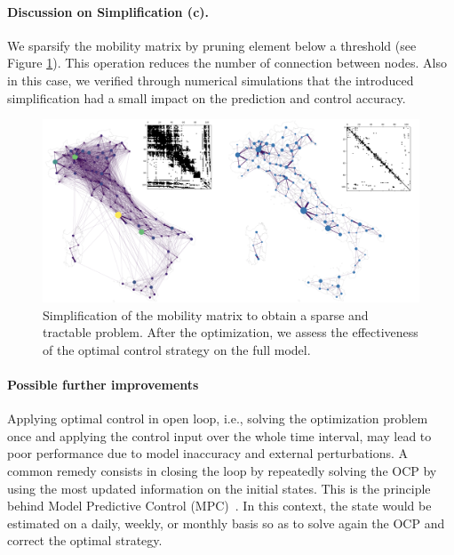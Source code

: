 \paragraph{Discussion on Simplification (c).} We sparsify the mobility matrix by pruning element below a threshold (see Figure \ref{figSI:mobility_simplification}). This operation reduces the number of connection between nodes. Also in this case, we verified through numerical simulations that the introduced simplification had a small impact on the prediction and control accuracy.

\begin{figure}
\centering
\includegraphics[width=\textwidth]{fig_italy-ocp/figuresSI/mobsimplification.png}
\caption[Simplification of the mobility matrix to obtain a sparse and tractable problem]{Simplification of the mobility matrix to obtain a sparse and tractable problem. After the optimization, we assess the effectiveness of the optimal control strategy on the full model.} \label{figSI:mobility_simplification}
\end{figure}

\paragraph{Possible further improvements} Applying optimal control in open loop, i.e., solving the optimization problem once and applying the control input over the whole time interval, may lead to poor performance due to model inaccuracy and external perturbations. A common remedy consists in closing the loop by repeatedly solving the OCP by using the most updated information on the initial states. This is the principle behind Model Predictive Control (MPC)~\cite{Rawlings:ModelPredictiveControl:2017}. In this context, the state would be estimated on a daily, weekly, or monthly basis so as to solve again the OCP and correct the optimal strategy.

